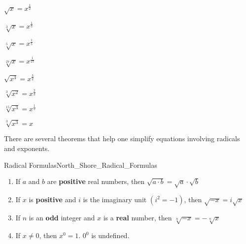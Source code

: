 \documentclass[crop=false,class=book,oneside]{standalone}
\begin{document}
            \begin{fexample}{}{}
                \begin{enumerate}
                    \begin{multicols}{4}
                        \item $\sqrt{x}=x^{\frac{1}{2}}$
                        \item $\sqrt[3]{x}=x^{\frac{1}{3}}$
                        \item $\sqrt[5]{x}=x^{\frac{1}{5}}$
                        \item $\sqrt[27]{x}=x^{\frac{1}{27}}$
                        \item $\sqrt{x^3}=x^{\frac{3}{2}}$
                        \item $\sqrt[3]{x^2}=x^{\frac{2}{3}}$
                        \item $\sqrt[15]{x^3}=x^{\frac{1}{5}}$
                        \item $\sqrt[3]{x^3}=x$
                    \end{multicols}
                \end{enumerate}
            \end{fexample}
            There are several theorems that help one simplify
            equations involving radicals and exponents.
            \begin{ftheorem}{Radical Formulas}{North_Shore_Radical_Formulas}
                \begin{enumerate}
                    \item If $a$ and $b$ are \textbf{positive} real numbers,
                          then $\sqrt{{a}\cdot{b}}=\sqrt{a}\cdot\sqrt{b}$
                    \item If $x$ is \textbf{positive} and $i$ is the
                          imaginary unit $(i^{2}=-1)$, then $\sqrt{-x}=i\sqrt{x}$
                    \item If $n$ is an \textbf{odd} integer
                          and $x$ is a \textbf{real} number,
                          then $\sqrt[n]{-x}=-\sqrt[n]{x}$
                    \item If $x\ne{0}$, then $x^{0}=1$. $0^{0}$ is undefined.
                \end{enumerate}
            \end{ftheorem}
\end{document}
